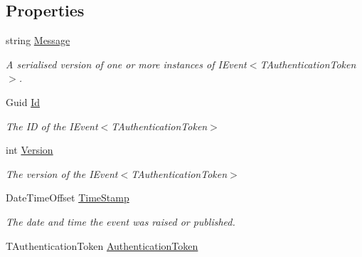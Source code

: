 \subsection*{Properties}
\begin{DoxyCompactItemize}
\item 
string \hyperlink{classCqrs_1_1EventStore_1_1SimpleEvent_a4e07144de1cdb94bbbf1313eb0e1f35d_a4e07144de1cdb94bbbf1313eb0e1f35d}{Message}
\begin{DoxyCompactList}\small\item\em A serialised version of one or more instances of I\+Event$<$\+T\+Authentication\+Token$>$. \end{DoxyCompactList}\item 
Guid \hyperlink{classCqrs_1_1EventStore_1_1SimpleEvent_a7baf42c52ddbd269ae3739ddd7a777a4_a7baf42c52ddbd269ae3739ddd7a777a4}{Id}
\begin{DoxyCompactList}\small\item\em The ID of the I\+Event$<$\+T\+Authentication\+Token$>$ \end{DoxyCompactList}\item 
int \hyperlink{classCqrs_1_1EventStore_1_1SimpleEvent_a9c67d7a71f357201db7801cd9122415e_a9c67d7a71f357201db7801cd9122415e}{Version}
\begin{DoxyCompactList}\small\item\em The version of the I\+Event$<$\+T\+Authentication\+Token$>$ \end{DoxyCompactList}\item 
Date\+Time\+Offset \hyperlink{classCqrs_1_1EventStore_1_1SimpleEvent_a47ab7f023f640dbfe6a1f1395a94b147_a47ab7f023f640dbfe6a1f1395a94b147}{Time\+Stamp}
\begin{DoxyCompactList}\small\item\em The date and time the event was raised or published. \end{DoxyCompactList}\item 
T\+Authentication\+Token \hyperlink{classCqrs_1_1EventStore_1_1SimpleEvent_a91ca9d263c41a4b5ffc30f9245aa6fe9_a91ca9d263c41a4b5ffc30f9245aa6fe9}{Authentication\+Token}

\end{DoxyCompactItemize}
